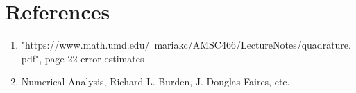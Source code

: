 \documentclass[12pt]{article}
\begin{document}
\newpage
\section{References}

\begin{enumerate}
	\item "https://www.math.umd.edu/~mariakc/AMSC466/LectureNotes/quadrature.pdf", page 22 error estimates
	\item Numerical Analysis, Richard L. Burden, J. Douglas Faires, etc.
\end{enumerate}
\end{document}
